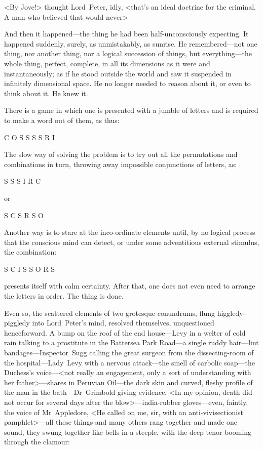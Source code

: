 <By Jove!> thought Lord~Peter, idly, <that's an ideal doctrine for the criminal. A man who believed that would never\longdash>

And then it happened—the thing he had been half-unconsciously expecting. It happened suddenly, surely, as unmistakably, as sunrise. He remembered—not one thing, nor another thing, nor a logical succession of things, but everything—the whole thing, perfect, complete, in all its dimensions as it were and instantaneously; as if he stood outside the world and saw it suspended in infinitely dimensional space. He no longer needed to reason about it, or even to think about it. He knew it.

There is a game in which one is presented with a jumble of letters and is required to make a word out of them, as thus:

\begin{center}\scshape
C O S S S S R I
\end{center}

The slow way of solving the problem is to try out all the permutations and combinations in turn, throwing away impossible conjunctions of letters, as:

\begin{center}\scshape
S S S I R C
\end{center}

or

\begin{center}\scshape
S C S R S O
\end{center}

Another way is to stare at the inco-ordinate elements until, by no logical process that the conscious mind can detect, or under some adventitious external stimulus, the combination:

\begin{center}\scshape
S C I S S O R S
\end{center}

presents itself with calm certainty. After that, one does not even need to arrange the letters in order. The thing is done.

Even so, the scattered elements of two grotesque conundrums, flung higgledy-piggledy into Lord~Peter's mind, resolved themselves, unquestioned henceforward. A bump on the roof of the end house—Levy in a welter of cold rain talking to a prostitute in the Battersea Park Road—a single ruddy hair—lint bandages—Inspector~Sugg calling the great surgeon from the dissecting-room of the hospital—Lady~Levy with a nervous attack—the smell of carbolic soap—the Duchess's voice—<not really an engagement, only a sort of understanding with her father>—shares in Peruvian Oil—the dark skin and curved, fleshy profile of the man in the bath—Dr~Grimbold giving evidence, <In my opinion, death did not occur for several days after the blow>—india-rubber gloves—even, faintly, the voice of Mr~Appledore, <He called on me, sir, with an anti-vivisectionist pamphlet>—all these things and many others rang together and made one sound, they swung together like bells in a steeple, with the deep tenor booming through the clamour:

